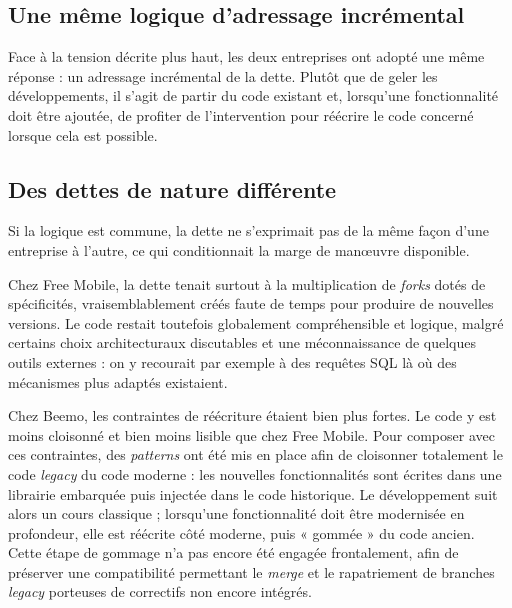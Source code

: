 \subsection{Une même logique d'adressage incrémental}
Face à la tension décrite plus haut, les deux entreprises ont adopté une même
réponse : un adressage incrémental de la dette. Plutôt que de geler les
développements, il s'agit de partir du code existant et, lorsqu'une
fonctionnalité doit être ajoutée, de profiter de
l'intervention pour réécrire le code concerné lorsque cela est possible.

\subsection{Des dettes de nature différente}
Si la logique est commune, la dette ne s'exprimait pas de la même façon d'une
entreprise à l'autre, ce qui conditionnait la marge de manœuvre disponible.

Chez Free Mobile, la dette tenait surtout à la multiplication de \emph{forks}
dotés de spécificités, vraisemblablement créés faute de temps pour produire de
nouvelles versions. Le code restait toutefois globalement compréhensible et
logique, malgré certains choix architecturaux discutables et une méconnaissance
de quelques outils externes : on y recourait par exemple à des requêtes SQL là
où des mécanismes plus adaptés existaient.

Chez Beemo, les contraintes de réécriture étaient bien plus fortes. Le code y
est moins cloisonné et bien moins lisible que chez Free Mobile. Pour composer avec ces
contraintes, des \emph{patterns} ont été mis en place afin de cloisonner
totalement le code \emph{legacy} du code moderne : les nouvelles fonctionnalités
sont écrites dans une librairie embarquée puis injectée dans le code historique.
Le développement suit alors un cours classique ; lorsqu'une fonctionnalité doit
être modernisée en profondeur, elle est réécrite côté moderne, puis « gommée »
du code ancien. Cette étape de gommage n'a pas encore été engagée frontalement,
afin de préserver une compatibilité permettant le \emph{merge} et le
rapatriement de branches \emph{legacy} porteuses de correctifs non encore
intégrés.


